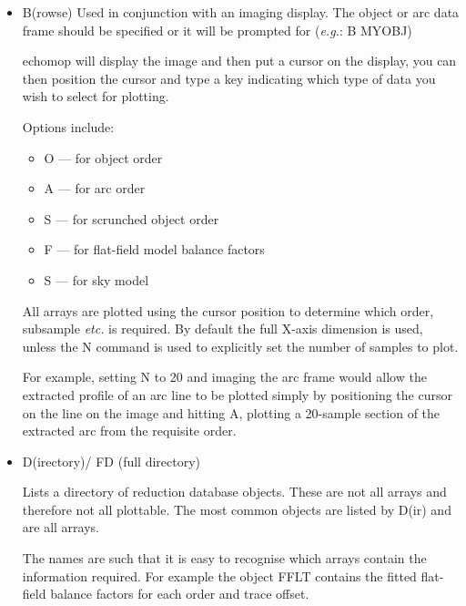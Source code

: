 \begin{itemize}

\item {\sunspec{\Large\tt}{\bf} B}(rowse)
     Used in conjunction with an imaging display.
     The object or arc data frame should be specified or it will be
     prompted for ({\it{e.g.}}:  B MYOBJ)

     {\sc echomop} will display the image and then put a cursor on the display,
     you can then position the cursor and type a key indicating which type of
     data you wish to select for plotting.

     Options include:

     \begin{itemize}

     \item {O --- for object order}
     \item {A --- for arc order}
     \item {S --- for scrunched object order}
     \item {F --- for flat-field model balance factors}
     \item {S --- for sky model}

     \end{itemize}

     All arrays are plotted using the cursor position to determine which
     order, subsample {\it etc.} is required. By default the full X-axis
     dimension is used, unless the N command is used to explicitly set the
     number of samples to plot.

     For example, setting N to 20 and imaging the arc frame would allow
     the extracted profile of an arc line to be plotted simply by
     positioning the cursor on the line on the image and hitting A,
     plotting a 20-sample section of the extracted arc from the requisite
     order.

\item {\sunspec{\Large\tt}{\bf} D}(irectory)/
      {\sunspec{\Large\tt}{\bf} FD} (full directory)

     Lists a directory of reduction database
     objects. These are not all arrays and therefore not all plottable.
     The most common objects are listed by D(ir) and are all arrays.

     The names are such that it is easy to recognise which arrays contain
     the information required. For example the object FFLT contains the
     fitted flat-field balance factors for each order and trace offset.


\end{itemize}
